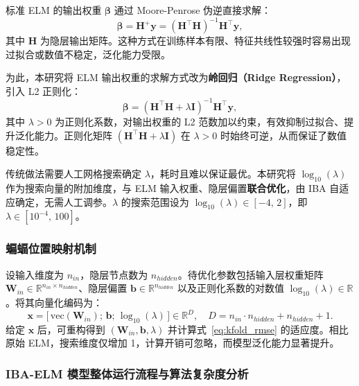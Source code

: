 \documentclass[11pt]{article}
\begin{document}
标准 ELM 的输出权重 $\boldsymbol{\beta}$ 通过 Moore-Penrose 伪逆直接求解：
\begin{equation}
\boldsymbol{\beta} = \mathbf{H}^{+}\mathbf{y} = (\mathbf{H}^{\top}\mathbf{H})^{-1}\mathbf{H}^{\top}\mathbf{y},
\label{eq:elm_pseudoinverse}
\end{equation}
其中 $\mathbf{H}$ 为隐层输出矩阵。这种方式在训练样本有限、特征共线性较强时容易出现过拟合或数值不稳定，泛化能力受限。

为此，本研究将 ELM 输出权重的求解方式改为\textbf{岭回归（Ridge Regression）}，引入 L2 正则化：
\begin{equation}
\boldsymbol{\beta} = (\mathbf{H}^{\top}\mathbf{H} + \lambda\mathbf{I})^{-1}\mathbf{H}^{\top}\mathbf{y},
\label{eq:elm_ridge}
\end{equation}
其中 $\lambda > 0$ 为正则化系数，对输出权重的 L2 范数加以约束，有效抑制过拟合、提升泛化能力。正则化矩阵 $(\mathbf{H}^{\top}\mathbf{H}+\lambda\mathbf{I})$ 在 $\lambda > 0$ 时始终可逆，从而保证了数值稳定性。

传统做法需要人工网格搜索确定 $\lambda$，耗时且难以保证最优。本研究将 $\log_{10}(\lambda)$ 作为搜索向量的附加维度，与 ELM 输入权重、隐层偏置\textbf{联合优化}，由 IBA 自适应确定，无需人工调参。$\lambda$ 的搜索范围设为 $\log_{10}(\lambda)\in[-4,\,2]$，即 $\lambda\in[10^{-4},\,100]$。

\subsubsection{蝙蝠位置映射机制}
\label{subsec:ch4_mapping}

设输入维度为 $n_{in}$，隐层节点数为 $n_{hidden}$。待优化参数包括输入层权重矩阵 $\mathbf{W}_{in}\in\mathbb{R}^{n_{in}\times n_{hidden}}$、隐层偏置 $\mathbf{b}\in\mathbb{R}^{n_{hidden}}$ 以及正则化系数的对数值 $\log_{10}(\lambda)\in\mathbb{R}$。将其向量化编码为：
\begin{equation}
\mathbf{x}=\Big[\,\mathrm{vec}(\mathbf{W}_{in});\,\mathbf{b};\,\log_{10}(\lambda)\,\Big]\in\mathbb{R}^{D},
\quad
D=n_{in}\cdot n_{hidden}+n_{hidden}+1.
\label{eq:vectorize}
\end{equation}
给定 $\mathbf{x}$ 后，可重构得到 $(\mathbf{W}_{in},\mathbf{b},\lambda)$ 并计算式~\eqref{eq:kfold_rmse} 的适应度。相比原始 ELM，搜索维度仅增加 1，计算开销可忽略，而模型泛化能力显著提升。

\subsubsection{IBA-ELM 模型整体运行流程与算法复杂度分析}
\label{subsec:ch4_workflow_complexity}
\end{document}
